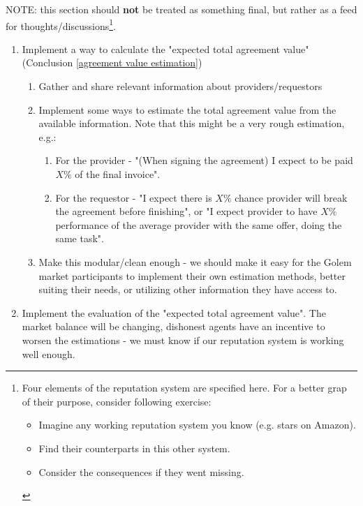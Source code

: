 \documentclass{article}
\begin{document}
NOTE: this section should \textbf{not} be treated as something final, but rather as a feed for thoughts/discussions\footnote{
    Four elements of the reputation system are specified here. For a better grap of their purpose, consider following exercise:
    \begin{itemize}
        \item Imagine any working reputation system you know (e.g. stars on Amazon).
        \item Find their counterparts in this other system.
        \item Consider the consequences if they went missing.
    \end{itemize}
}.

\begin{enumerate}
    \item Implement a way to calculate the "expected total agreement value" (Conclusion \ref{agreement value estimation})
        \begin{enumerate}
            \item Gather and share relevant information about providers/requestors
            \item Implement some ways to estimate the total agreement value from the available information.
                Note that this might be a very rough estimation, e.g.:
                \begin{enumerate}
                    \item For the provider - "(When signing the agreement) I expect to be paid $X\%$ of the final invoice".
                    \item For the requestor - "I expect there is $X\%$ chance provider will break the agreement before finishing", 
                        or "I expect provider to have $X\%$ performance of the average provider with the same offer, doing the same task".
                \end{enumerate}
            \item Make this modular/clean enough - we should make it easy for the Golem market participants 
                to implement their own estimation methods, better suiting their needs, or utilizing other information they have access to.
        \end{enumerate}
    \item Implement the evaluation of the "expected total agreement value". The market balance will be changing, dishonest agents have an incentive
        to worsen the estimations - we must know if our reputation system is working well enough.

\end{enumerate}
\end{document}
